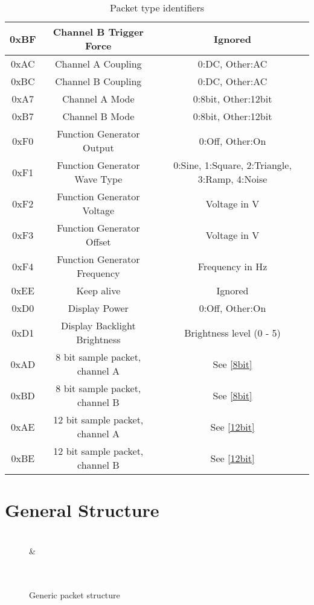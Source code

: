 \documentclass[]{article}
\begin{document}
\begin{table}[H]
\begin{tabular}{|c|c|c|}
		0xBF & Channel B Trigger Force & Ignored \\ \hline 
		0xAC & Channel A Coupling & 0:DC, Other:AC \\ \hline
		0xBC & Channel B Coupling & 0:DC, Other:AC \\ \hline
		0xA7 & Channel A Mode & 0:8bit, Other:12bit \\ \hline
		0xB7 & Channel B Mode & 0:8bit, Other:12bit \\ \hline
		0xF0 & Function Generator Output & 0:Off, Other:On \\ \hline
		0xF1 & Function Generator Wave Type & 0:Sine, 1:Square, 2:Triangle, 3:Ramp, 4:Noise \\ \hline
		0xF2 & Function Generator Voltage & Voltage in \textmu V \\ \hline
		0xF3 & Function Generator Offset & Voltage in \textmu V \\ \hline
		0xF4 & Function Generator Frequency & Frequency in Hz \\ \hline
		0xEE & Keep alive & Ignored \\ \hline
		0xD0 & Display Power & 0:Off, Other:On \\ \hline
		0xD1 & Display Backlight Brightness & Brightness level (0 - 5) \\ \hline
		0xAD & 8 bit sample packet, channel A & See \autoref{8bit} \\ \hline
		0xBD & 8 bit sample packet, channel B & See \autoref{8bit} \\ \hline
		0xAE & 12 bit sample packet, channel A & See \autoref{12bit} \\ \hline
		0xBE & 12 bit sample packet, channel B & See \autoref{12bit} \\ \hline
	\end{tabular}
	\caption{Packet type identifiers}
\end{table}

\section{General Structure}
\begin{figure}[H]
	\centering
	\begin{bytefield}[bitwidth=2em]{16}
		 \\
		 &  \\
		 \\
		 \\
	\end{bytefield}
	\caption{Generic packet structure}
\end{figure}
\end{document}
